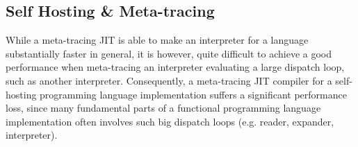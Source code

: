 \subsection{Self Hosting \& Meta-tracing}

While a meta-tracing JIT is able to make an interpreter for a language
substantially faster in general, it is however, quite difficult to
achieve a good performance when meta-tracing an interpreter evaluating
a large dispatch loop, such as another interpreter. Consequently, a
meta-tracing JIT compiler for a self-hosting programming language
implementation suffers a significant performance loss, since many
fundamental parts of a functional programming language implementation
often involves such big dispatch loops (e.g. reader, expander,
interpreter).
